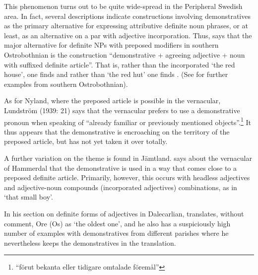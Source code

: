 This phenomenon turns out to be quite wide-spread in the Peripheral Swedish area. In fact, several descriptions indicate constructions involving demonstratives as the primary alternative for expressing attributive definite noun phrases, or at least, as an alternative on a par with adjective incorporation. Thus, \citet{Ivars2005} says that the major alternative for definite NPs with preposed modifiers in southern Ostrobothnian is the construction “demonstrative  + agreeing adjective + noun with suffixed definite article”. That is, rather than the incorporated  ‘the red house’, one finds  and rather than  ‘the red hut’ one finds . (See \citet[158]{Vangsnes2003} for further examples from southern Ostrobothnian). 


As for Nyland, where the preposed article is possible in the vernacular, Lundström (1939: 21) says that the vernacular prefers to use a demonstrative pronoun when speaking of “already familiar or previously mentioned objects”.\footnote{ “förut bekanta eller tidigare omtalade föremål”} It thus appears that the demonstrative is encroaching on the territory of the preposed article, but has not yet taken it over totally. 


A further variation on the theme is found in Jämtland. \citet[38]{Reinhammar2005} says about the vernacular of Hammerdal that the demonstrative is used in a way that comes close to a preposed definite article. Primarily, however, this occurs with headless adjectives and adjective-noun compounds (incorporated adjectives) combinations, as in ‘that small boy’. 


In his section on definite forms of adjectives in Dalecarlian, \citet[147]{Levander1928} translates, without comment, Ore (Os)  as ‘the oldest one’, and he also has a suspiciously high number of examples with demonstratives from different parishes where he nevertheless keeps the demonstratives in the translation. 

